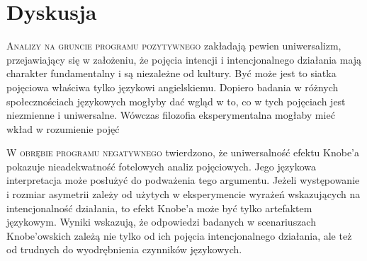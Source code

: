 \documentclass[a4paper]{tufte-handout}
\begin{document}
 \section{Dyskusja}\label{sec:page-layout}
 \begin{fullwidth}
 \textsc{Analizy na gruncie programu pozytywnego} zakładają pewien uniwersalizm, przejawiający się w założeniu, że pojęcia intencji i intencjonalnego działania mają charakter fundamentalny i są niezależne od kultury. Być może jest to siatka pojęciowa właściwa tylko językowi angielskiemu. Dopiero badania w różnych społecznościach językowych mogłyby dać wgląd w to, co w tych pojęciach jest niezmienne i uniwersalne. Wówczas filozofia eksperymentalna mogłaby mieć wkład w rozumienie pojęć

 
 \noindent \textsc{W obrębie programu negatywnego} twierdzono, że uniwersalność efektu Knobe'a pokazuje nieadekwatność fotelowych analiz pojęciowych. Jego językowa interpretacja może posłużyć do podważenia tego argumentu. Jeżeli występowanie i rozmiar asymetrii zależy od użytych w eksperymencie wyrażeń wskazujących na intencjonalność działania, to efekt Knobe'a może być tylko artefaktem językowym. Wyniki wskazują, że odpowiedzi badanych w scenariuszach Knobe'owskich zależą nie tylko od ich pojęcia intencjonalnego działania, ale też od trudnych do wyodrębnienia czynników językowych.
 

\end{fullwidth}
\end{document}
